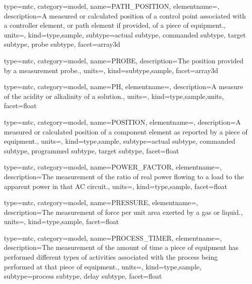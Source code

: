 {
  type=mtc,
  category=model,
  name={PATH\_POSITION},
  elementname=,
  description={A measured or calculated position of a control point associated with a \gls{controller} element, or \gls{path} element if provided, of a piece of equipment.},
  units=,
  kind={type,sample},
  subtype={\gls{actual subtype}, \gls{commanded subtype}, \gls{target subtype}, \gls{probe subtype}},
  facet={\gls{array3d}}
}


{
  type=mtc,
  category=model,
  name={PROBE},
  description={The position provided by a measurement probe.},
  units=,
  kind={subtype,sample},
  facet={\gls{array3d}}
}


{
  type=mtc,
  category=model,
  name={PH},
  elementname=,
  description={A measure of the acidity or alkalinity of a solution.},
  units=,
  kind={type,sample,units},
  facet={\gls{float}}
}


{
  type=mtc,
  category=model,
  name={POSITION},
  elementname=,
  description={A measured or calculated position of a \gls{component} element as reported by a piece of equipment.},
  units=,
  kind={type,sample},
  subtype={\gls{actual subtype}, \gls{commanded subtype}, \gls{programmed subtype}, \gls{target subtype}},
  facet={\gls{float}}
}


{
  type=mtc,
  category=model,
  name={POWER\_FACTOR},
  elementname=,
  description={The measurement of the ratio of real power flowing to a load to the apparent power in that AC circuit.},
  units=,
  kind={type,sample},
  facet={\gls{float}}
}


{
  type=mtc,
  category=model,
  name={PRESSURE},
  elementname=,
  description={The measurement of force per unit area exerted by a gas or liquid.},
  units=,
  kind={type,sample},
  facet={\gls{float}}
}


{
  type=mtc,
  category=model,
  name={PROCESS\_TIMER},
  elementname=,
  description={The measurement of the amount of time a piece of equipment has performed different types of activities associated with the process being performed at that piece of equipment.},
  units=,
  kind={type,sample},
  subtype={\gls{process subtype}, \gls{delay subtype}},
  facet={\gls{float}}
}




